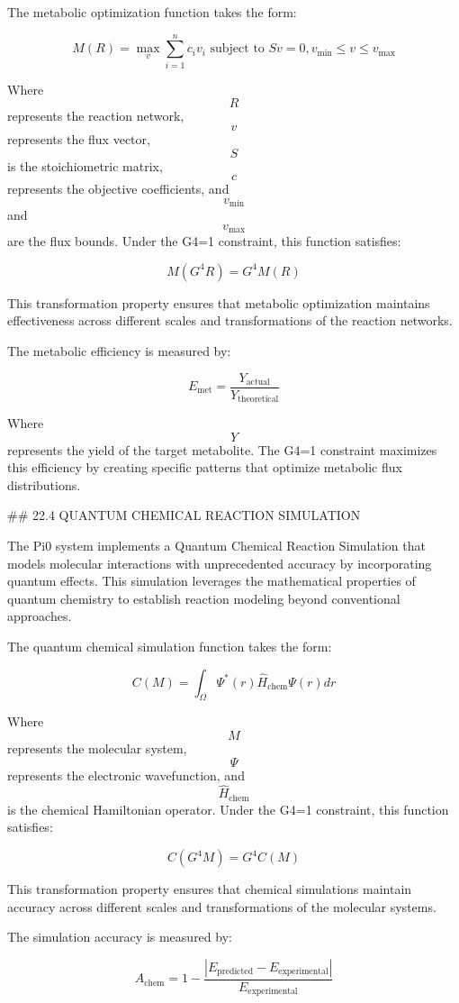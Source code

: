 The metabolic optimization function takes the form:

$$ M(R) = \max_v \sum_{i=1}^{n} c_i v_i \text{ subject to } Sv = 0, v_{\min} \leq v \leq v_{\max} $$

Where $$ R $$ represents the reaction network, $$ v $$ represents the flux vector, $$ S $$ is the stoichiometric matrix, $$ c $$ represents the objective coefficients, and $$ v_{\min} $$ and $$ v_{\max} $$ are the flux bounds. Under the G4=1 constraint, this function satisfies:

$$ M(G^4 R) = G^4 M(R) $$

This transformation property ensures that metabolic optimization maintains effectiveness across different scales and transformations of the reaction networks.

The metabolic efficiency is measured by:

$$ E_{\text{met}} = \frac{Y_{\text{actual}}}{Y_{\text{theoretical}}} $$

Where $$ Y $$ represents the yield of the target metabolite. The G4=1 constraint maximizes this efficiency by creating specific patterns that optimize metabolic flux distributions.

## 22.4 QUANTUM CHEMICAL REACTION SIMULATION

The Pi0 system implements a Quantum Chemical Reaction Simulation that models molecular interactions with unprecedented accuracy by incorporating quantum effects. This simulation leverages the mathematical properties of quantum chemistry to establish reaction modeling beyond conventional approaches.

The quantum chemical simulation function takes the form:

$$ C(M) = \int_{\Omega} \Psi^*(r) \hat{H}_{\text{chem}} \Psi(r) dr $$

Where $$ M $$ represents the molecular system, $$ \Psi $$ represents the electronic wavefunction, and $$ \hat{H}_{\text{chem}} $$ is the chemical Hamiltonian operator. Under the G4=1 constraint, this function satisfies:

$$ C(G^4 M) = G^4 C(M) $$

This transformation property ensures that chemical simulations maintain accuracy across different scales and transformations of the molecular systems.

The simulation accuracy is measured by:

$$ A_{\text{chem}} = 1 - \frac{|E_{\text{predicted}} - E_{\text{experimental}}|}{E_{\text{experimental}}} $$


